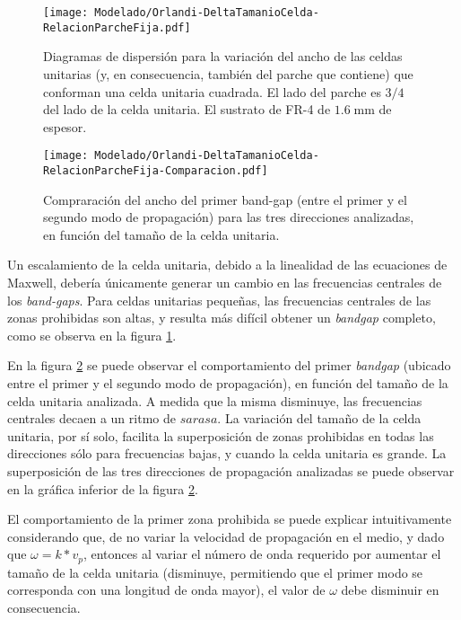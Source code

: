 \begin{figure}[h]
	\centering
	\texttt{[image: Modelado/Orlandi-DeltaTamanioCelda-RelacionParcheFija.pdf]}
	\caption{Diagramas de dispersión para la variación del ancho de las celdas unitarias (y, en consecuencia, también del parche que contiene) que conforman una celda unitaria cuadrada. El lado del parche es $3/4$ del lado de la celda unitaria. El sustrato de FR-4 de $1.6\;\text{mm}$ de espesor.}
	\label{fig:diagdisp-orlandi-variacion-tam-celda-unitaria}
\end{figure}

\begin{figure}[h]
	\centering
	\texttt{[image: Modelado/Orlandi-DeltaTamanioCelda-RelacionParcheFija-Comparacion.pdf]}
	\caption{Compraración del ancho del primer band-gap (entre el primer y el segundo modo de propagación) para las tres direcciones analizadas, en función del tamaño de la celda unitaria.}
	\label{fig:comparacion-diagdisp-orlandi-variacion-tam-celda-unitaria}
\end{figure}

Un escalamiento de la celda unitaria, debido a la linealidad de las ecuaciones de Maxwell, debería únicamente generar un cambio en las frecuencias centrales de los \textit{band-gaps}. Para celdas unitarias pequeñas, las frecuencias centrales de las zonas prohibidas son altas, y resulta más difícil obtener un \textit{bandgap} completo, como se observa en la figura \ref{fig:diagdisp-orlandi-variacion-tam-celda-unitaria}.

En la figura \ref{fig:comparacion-diagdisp-orlandi-variacion-tam-celda-unitaria} se puede observar el comportamiento del primer \textit{bandgap} (ubicado entre el primer y el segundo modo de propagación), en función del tamaño de la celda unitaria analizada. A medida que la misma disminuye, las frecuencias centrales decaen a un ritmo de $sarasa$. La variación del tamaño de la celda unitaria, por sí solo, facilita la superposición de zonas prohibidas en todas las direcciones sólo para frecuencias bajas, y cuando la celda unitaria es grande. La superposición de las tres direcciones de propagación analizadas se puede observar en la gráfica inferior de la figura \ref{fig:comparacion-diagdisp-orlandi-variacion-tam-celda-unitaria}.

El comportamiento de la primer zona prohibida se puede explicar intuitivamente considerando que, de no variar la velocidad de propagación en el medio, y dado que $\omega =k*v_p$, entonces al variar el número de onda requerido por aumentar el tamaño de la celda unitaria (disminuye, permitiendo que el primer modo se corresponda con una longitud de onda mayor), el valor de $\omega$ debe disminuir en consecuencia.

